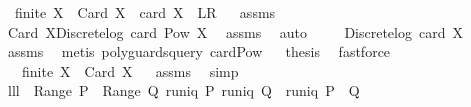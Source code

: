 \begin{isabellebody}
\isamarkupfalse%
\ \ {\isachardoublequoteopen}finite\ X{\isachardoublequoteclose}\ \ {\isachardoublequoteopen}Card\ X\ {\isacharequal}\ card\ X{\isachardoublequoteclose}\ {\isacharparenleft}\ {\isachardoublequoteopen}{\isacharquery}L{\isacharequal}{\isacharquery}R{\isachardoublequoteclose}{\isacharparenright}%
\isadelimproof
\ %
\endisadelimproof
%
\isatagproof
{}\isamarkupfalse%
\ assms\ \isanewline
{}\isamarkupfalse%
\ {\isacharminus}\isanewline
{}\isamarkupfalse%
\ {\isachardoublequoteopen}Card\ X{\isacharequal}Discrete{\isachardot}log\ {\isacharparenleft}card\ {\isacharparenleft}Pow\ X{\isacharparenright}{\isacharparenright}{\isachardoublequoteclose}\ \isamarkupfalse%
\ assms\ \isamarkupfalse%
\ auto\isanewline
{}\isamarkupfalse%
\ \isamarkupfalse%
\ {\isachardoublequoteopen}{\isachardot}{\isachardot}{\isachardot}\ {\isacharequal}\ Discrete{\isachardot}log\ {\isacharparenleft}{}{\isacharcircum}card\ X{\isacharparenright}{\isachardoublequoteclose}\ \isamarkupfalse%
\ assms\ \isamarkupfalse%
\ {\isacharparenleft}metis\ {\isacharparenleft}poly{\isacharunderscore}guards{\isacharunderscore}query{\isacharparenright}\ card{\isacharunderscore}Pow{\isacharparenright}\isanewline
{}\isamarkupfalse%
\ \isamarkupfalse%
\ {\isacharquery}thesis\ \isamarkupfalse%
\ fastforce\isanewline
{}\isamarkupfalse%
%
\endisatagproof
{\isafoldproof}%
%
\isadelimproof
%
\endisadelimproof
\isanewline
\isanewline
{}\isamarkupfalse%
\ \ {\isachardoublequoteopen}{\isasymnot}\ {\isacharparenleft}finite\ X{\isacharparenright}{\isachardoublequoteclose}\ \ {\isachardoublequoteopen}Card\ X{\isacharequal}{\isacharminus}{}{\isachardoublequoteclose}%
\isadelimproof
\ %
\endisadelimproof
%
\isatagproof
{}\isamarkupfalse%
\ assms\ \isamarkupfalse%
\ simp%
\endisatagproof
{\isafoldproof}%
%
\isadelimproof
%
\endisadelimproof
\isanewline
\isanewline
{}\isamarkupfalse%
\ lll{}{}{\isacharcolon}\ \ {\isachardoublequoteopen}Range\ P\ {\isasyminter}\ {\isacharparenleft}Range\ Q{\isacharparenright}{\isacharequal}{\isacharbraceleft}{\isacharbraceright}{\isachardoublequoteclose}\ {\isachardoublequoteopen}runiq\ {\isacharparenleft}P{\isacharcircum}{\isacharminus}{}{\isacharparenright}{\isachardoublequoteclose}\ {\isachardoublequoteopen}runiq\ {\isacharparenleft}Q{\isacharcircum}{\isacharminus}{}{\isacharparenright}{\isachardoublequoteclose}\ \ {\isachardoublequoteopen}runiq\ {\isacharparenleft}{\isacharparenleft}P\ {\isasymunion}\ Q{\isacharparenright}{\isacharcircum}{\isacharminus}{}{\isacharparenright}{\isachardoublequoteclose}\isanewline

\end{isabellebody}
